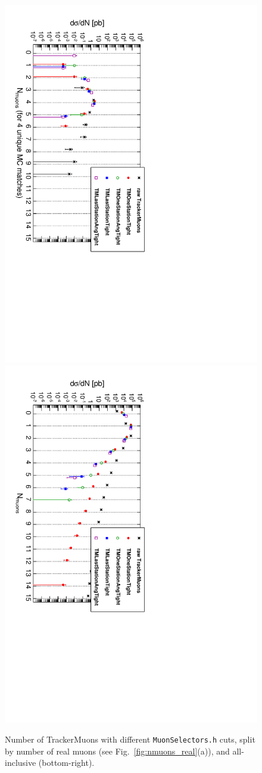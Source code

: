 \documentclass[12pt]{article}
\begin{document}
\begin{figure}[p]
\includegraphics[height=0.5\linewidth, angle=90]{fig/backgroundsMatching_plot/tracks_selectors_4real.pdf}
\includegraphics[height=0.5\linewidth, angle=90]{fig/backgroundsMatching_plot/tracks_selectors_allreal.pdf}

\caption{Number of TrackerMuons with different {\tt MuonSelectors.h} cuts, split by number of real muons (see Fig.~\ref{fig:nmuons_real}(a)), and all-inclusive (bottom-right). \label{fig:tracks_selectors}}
\end{figure}
\end{document}
